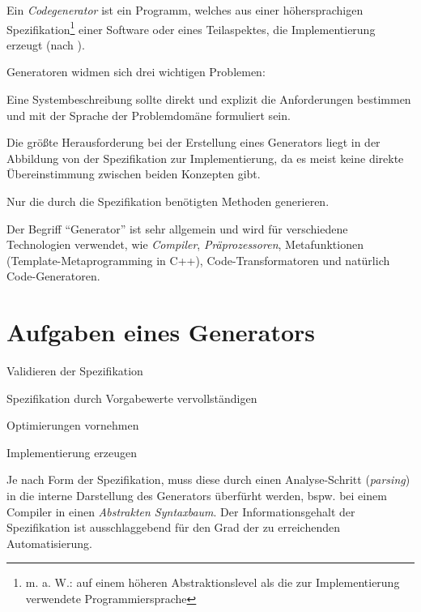 \begin{thesisDefinition}[Codegenerator]
Ein \emph{Codegenerator} ist ein Programm, welches aus einer höhersprachigen Spezifikation\footnote{m. a. W.: auf einem höheren Abstraktionslevel als die zur Implementierung verwendete Programmiersprache} einer Software oder eines Teilaspektes, die Implementierung erzeugt (nach \cite{czarnecki2000generative}).
\end{thesisDefinition}

Generatoren widmen sich drei wichtigen Problemen\cite{czarnecki2000generative}:
\begin{description}[style=nextline]
    \item[Relevanz von Systembeschreibungen erhöhen] Eine Systembeschreibung sollte direkt und explizit die Anforderungen bestimmen und mit der Sprache der Problemdomäne formuliert sein.
    \item[Erzeugung einer effizienten Implementierung] Die größte Herausforderung bei der Erstellung eines Generators liegt in der Abbildung von der Spezifikation zur Implementierung, da es meist keine direkte Übereinstimmung zwischen beiden Konzepten gibt.
    \item[\enquote{Library scaling problem}] Nur die durch die Spezifikation benötigten Methoden generieren.
\end{description}

Der Begriff \enquote{Generator} ist sehr allgemein und wird für verschiedene Technologien verwendet, wie \emph{Compiler}, \emph{Präprozessoren}, Metafunktionen (Template-Metaprogramming in C++), Code-Transformatoren und natürlich Code-Generatoren.

\section{Aufgaben eines Generators}
\begin{compactenum}
    \item Validieren der Spezifikation
    \item Spezifikation durch Vorgabewerte vervollständigen
    \item Optimierungen vornehmen
    \item Implementierung erzeugen
\end{compactenum}

Je nach Form der Spezifikation, muss diese durch einen Analyse-Schritt (\emph{parsing}) in die interne Darstellung des Generators überfürht werden, bspw. bei einem Compiler in einen \emph{Abstrakten Syntaxbaum}.
Der Informationsgehalt der Spezifikation ist ausschlaggebend für den Grad der zu erreichenden Automatisierung.

